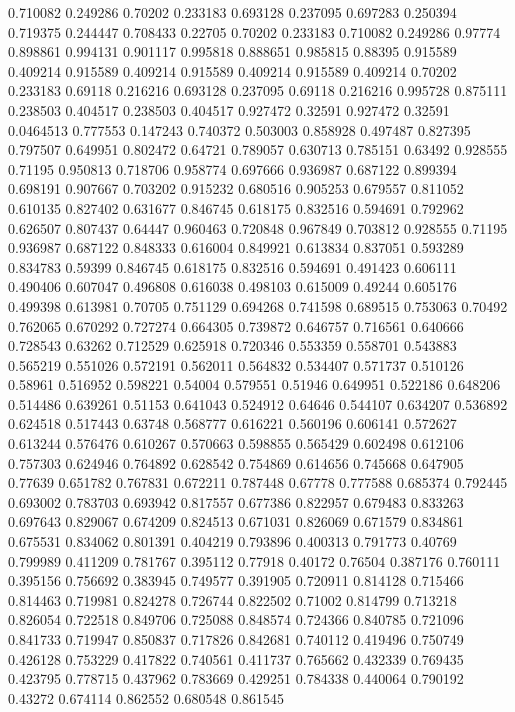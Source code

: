 0.710082 0.249286
0.70202 0.233183
0.693128 0.237095
0.697283 0.250394
0.719375 0.244447
0.708433 0.22705
0.70202 0.233183
0.710082 0.249286
0.97774 0.898861
0.994131 0.901117
0.995818 0.888651
0.985815 0.88395
0.915589 0.409214
0.915589 0.409214
0.915589 0.409214
0.915589 0.409214
0.70202 0.233183
0.69118 0.216216
0.693128 0.237095
0.69118 0.216216
0.995728 0.875111
0.238503 0.404517
0.238503 0.404517
0.927472 0.32591
0.927472 0.32591
0.0464513 0.777553
0.147243 0.740372
0.503003 0.858928
0.497487 0.827395
0.797507 0.649951
0.802472 0.64721
0.789057 0.630713
0.785151 0.63492
0.928555 0.71195
0.950813 0.718706
0.958774 0.697666
0.936987 0.687122
0.899394 0.698191
0.907667 0.703202
0.915232 0.680516
0.905253 0.679557
0.811052 0.610135
0.827402 0.631677
0.846745 0.618175
0.832516 0.594691
0.792962 0.626507
0.807437 0.64447
0.960463 0.720848
0.967849 0.703812
0.928555 0.71195
0.936987 0.687122
0.848333 0.616004
0.849921 0.613834
0.837051 0.593289
0.834783 0.59399
0.846745 0.618175
0.832516 0.594691
0.491423 0.606111
0.490406 0.607047
0.496808 0.616038
0.498103 0.615009
0.49244 0.605176
0.499398 0.613981
0.70705 0.751129
0.694268 0.741598
0.689515 0.753063
0.70492 0.762065
0.670292 0.727274
0.664305 0.739872
0.646757 0.716561
0.640666 0.728543
0.63262 0.712529
0.625918 0.720346
0.553359 0.558701
0.543883 0.565219
0.551026 0.572191
0.562011 0.564832
0.534407 0.571737
0.510126 0.58961
0.516952 0.598221
0.54004 0.579551
0.51946 0.649951
0.522186 0.648206
0.514486 0.639261
0.51153 0.641043
0.524912 0.64646
0.544107 0.634207
0.536892 0.624518
0.517443 0.63748
0.568777 0.616221
0.560196 0.606141
0.572627 0.613244
0.576476 0.610267
0.570663 0.598855
0.565429 0.602498
0.612106 0.757303
0.624946 0.764892
0.628542 0.754869
0.614656 0.745668
0.647905 0.77639
0.651782 0.767831
0.672211 0.787448
0.67778 0.777588
0.685374 0.792445
0.693002 0.783703
0.693942 0.817557
0.677386 0.822957
0.679483 0.833263
0.697643 0.829067
0.674209 0.824513
0.671031 0.826069
0.671579 0.834861
0.675531 0.834062
0.801391 0.404219
0.793896 0.400313
0.791773 0.40769
0.799989 0.411209
0.781767 0.395112
0.77918 0.40172
0.76504 0.387176
0.760111 0.395156
0.756692 0.383945
0.749577 0.391905
0.720911 0.814128
0.715466 0.814463
0.719981 0.824278
0.726744 0.822502
0.71002 0.814799
0.713218 0.826054
0.722518 0.849706
0.725088 0.848574
0.724366 0.840785
0.721096 0.841733
0.719947 0.850837
0.717826 0.842681
0.740112 0.419496
0.750749 0.426128
0.753229 0.417822
0.740561 0.411737
0.765662 0.432339
0.769435 0.423795
0.778715 0.437962
0.783669 0.429251
0.784338 0.440064
0.790192 0.43272
0.674114 0.862552
0.680548 0.861545
